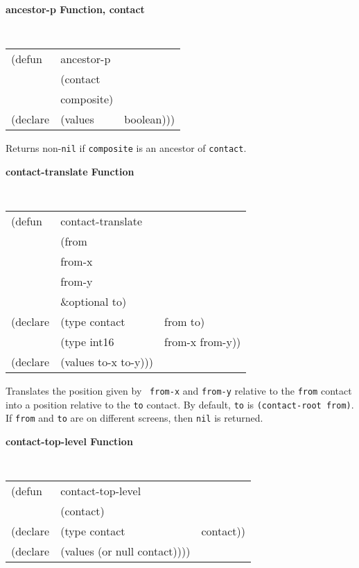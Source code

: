 \documentclass[twoside]{book}
\begin{document}
\begin{sloppy}
{\samepage
{\large {\bf ancestor-p \hfill Function, contact}} 
\begin{flushright} \parbox[t]{6.125in}{
\tt
\begin{tabular}{lll}
\raggedright
(defun & ancestor-p & \\ 
& (contact\\
&  composite) \\
(declare &(values  & boolean)))
\end{tabular}
\rm

}\end{flushright}}

\begin{flushright} \parbox[t]{6.125in}{
Returns non-{\tt nil} if {\tt composite} is an ancestor of {\tt contact}.

}\end{flushright}

{\samepage
{\large {\bf contact-translate \hfill Function}} 
\begin{flushright} 
\parbox[t]{6.125in}{
\tt
\begin{tabular}{lll}
\raggedright
(defun & contact-translate & \\ 
& (from \\
&  from-x \\
&  from-y \\
&  \&optional to) \\
(declare &(type contact & from to) \\
         &(type int16   & from-x from-y))\\
(declare &(values to-x to-y)))
\end{tabular}
\rm

}\end{flushright}}

\begin{flushright} \parbox[t]{6.125in}{ Translates the position given by {\tt
from-x} and {\tt from-y} relative to the {\tt from} contact into a position
relative to the {\tt to} contact. By default, {\tt to} is {\tt (contact-root
from)}. If {\tt from} and {\tt to} are on different screens, then {\tt nil} is
returned.

}\end{flushright}

{\samepage
{\large {\bf contact-top-level \hfill Function}} 
\begin{flushright} 
\parbox[t]{6.125in}{
\tt
\begin{tabular}{lll}
\raggedright
(defun & contact-top-level & \\ 
& (contact) \\
(declare &(type contact & contact))\\
(declare &(values (or null contact))))
\end{tabular}
\rm

}
\end{flushright}}
\end{sloppy}
\end{document}

